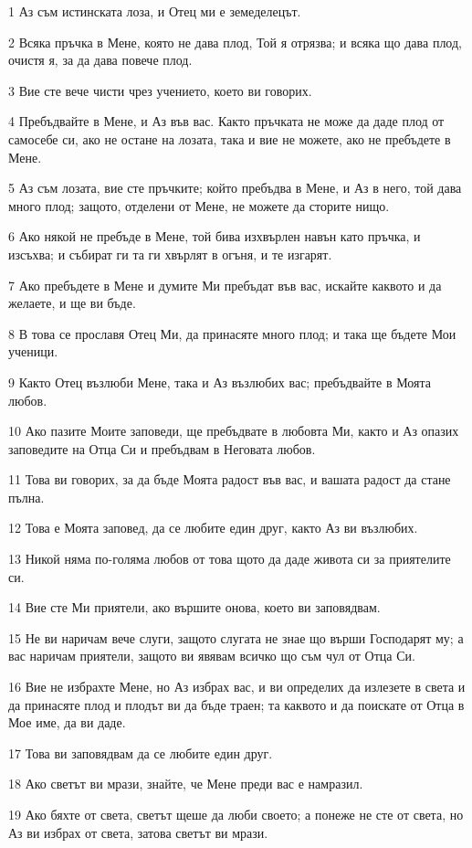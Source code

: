 \par 1 Аз съм истинската лоза, и Отец ми е земеделецът.
\par 2 Всяка пръчка в Мене, която не дава плод, Той я отрязва; и всяка що дава плод, очистя я, за да дава повече плод.
\par 3 Вие сте вече чисти чрез учението, което ви говорих.
\par 4 Пребъдвайте в Мене, и Аз във вас. Както пръчката не може да даде плод от самосебе си, ако не остане на лозата, така и вие не можете, ако не пребъдете в Мене.
\par 5 Аз съм лозата, вие сте пръчките; който пребъдва в Мене, и Аз в него, той дава много плод; защото, отделени от Мене, не можете да сторите нищо.
\par 6 Ако някой не пребъде в Мене, той бива изхвърлен навън като пръчка, и изсъхва; и събират ги та ги хвърлят в огъня, и те изгарят.
\par 7 Ако пребъдете в Мене и думите Ми пребъдат във вас, искайте каквото и да желаете, и ще ви бъде.
\par 8 В това се прославя Отец Ми, да принасяте много плод; и така ще бъдете Мои ученици.
\par 9 Както Отец възлюби Мене, така и Аз възлюбих вас; пребъдвайте в Моята любов.
\par 10 Ако пазите Моите заповеди, ще пребъдвате в любовта Ми, както и Аз опазих заповедите на Отца Си и пребъдвам в Неговата любов.
\par 11 Това ви говорих, за да бъде Моята радост във вас, и вашата радост да стане пълна.
\par 12 Това е Моята заповед, да се любите един друг, както Аз ви възлюбих.
\par 13 Никой няма по-голяма любов от това щото да даде живота си за приятелите си.
\par 14 Вие сте Ми приятели, ако вършите онова, което ви заповядвам.
\par 15 Не ви наричам вече слуги, защото слугата не знае що върши Господарят му; а вас наричам приятели, защото ви явявам всичко що съм чул от Отца Си.
\par 16 Вие не избрахте Мене, но Аз избрах вас, и ви определих да излезете в света и да принасяте плод и плодът ви да бъде траен; та каквото и да поискате от Отца в Мое име, да ви даде.
\par 17 Това ви заповядвам да се любите един друг.
\par 18 Ако светът ви мрази, знайте, че Мене преди вас е намразил.
\par 19 Ако бяхте от света, светът щеше да люби своето; а понеже не сте от света, но Аз ви избрах от света, затова светът ви мрази.
